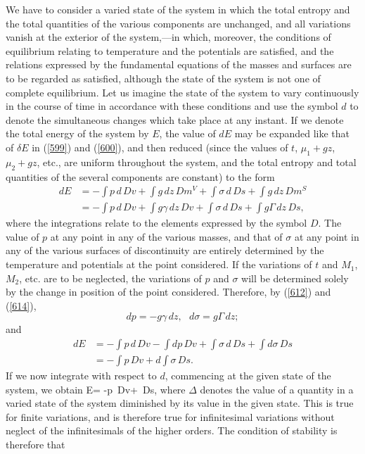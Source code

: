 \documentclass[12pt]{article}
\newcommand{\dd}{\delta}
\begin{document}
We have to consider a varied state of the system in which the total entropy and the total quantities of the various components are unchanged, and all variations vanish at the exterior of the system,---in which, moreover, the conditions of equilibrium relating to temperature and the potentials are satisfied, and the relations expressed by the fundamental equations of the masses and surfaces are to be regarded as satisfied, although the state of the system is not one of complete equilibrium. Let us imagine the state of the system to vary continuously in the course of time in accordance with these conditions and use the symbol $d$ to denote the simultaneous changes which take place at any instant. If we denote the total energy of the system by $E$, the value of $dE$ may be expanded like that of $\dd E$ in (\ref{599}) and (\ref{600}), and then reduced (since the values of $t$, $\mu_1+gz$, $\mu_2+gz$, etc., are uniform throughout the system, and the total entropy and total quantities of the several components are constant) to the form
\begin{align} dE &= -\int p \, d\, Dv +\int g \, dz \, Dm^V +\int \sigma \,d\,Ds +\int g \, dz\, Dm^S \nonumber \\
 &= -\int p \, d\, Dv +\int g \gamma\, dz \, Dv +\int \sigma \,d\,Ds +\int g \Gamma \, dz\, Ds,  \label{621} \end{align}
where the integrations relate to the elements expressed by the symbol $D$. The value of $p$ at any point in any of the various masses, and that of $\sigma$ at any point in any of the various surfaces of discontinuity are entirely determined by the temperature and potentials at the point considered. If the variations of $t$ and $M_1$, $M_2$, etc. are to be neglected, the variations of $p$ and $\sigma$ will be determined solely by the change in position of the point considered. Therefore, by (\ref{612}) and (\ref{614}),
$$dp=-g\gamma \, dz, \ \ \ d\sigma =g\Gamma \, dz;$$
and
\begin{align} dE&= -\int p \,d\, Dv -\int dp \, Dv +\int \sigma \, d\, Ds +\int d\sigma \, Ds\nonumber \\
 &=    -\int p \, Dv+d\int \sigma\, Ds.   \label{622} \end{align}
If we now integrate with respect to $d$, commencing at the given state of the system, we obtain
\eqs \Delta E= -\Delta \int p \,Dv+ \Delta \int \sigma  \,Ds,   \label{623} \eqe
where $\Delta$ denotes the value of a quantity in a varied state of the system diminished by its value in the given state. This is true for finite variations, and is therefore true for infinitesimal variations without neglect of the infinitesimals of the higher orders. The condition of stability is therefore that
\end{document}
